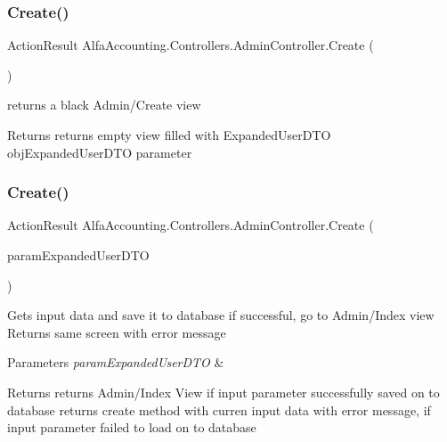 \subsubsection{\texorpdfstring{Create()}{Create()}\hspace{0.1cm}{\footnotesize\ttfamily [1/2]}}
{\footnotesize\ttfamily Action\+Result Alfa\+Accounting.\+Controllers.\+Admin\+Controller.\+Create (\begin{DoxyParamCaption}{ }\end{DoxyParamCaption})}



returns a black Admin/\+Create view 

\begin{DoxyReturn}{Returns}
returns empty view filled with Expanded\+User\+D\+TO obj\+Expanded\+User\+D\+TO parameter
\end{DoxyReturn}
\mbox{\label{class_alfa_accounting_1_1_controllers_1_1_admin_controller_a9b10157b4c6ffb1a37d8871e5c3d5df1}} 
\subsubsection{\texorpdfstring{Create()}{Create()}\hspace{0.1cm}{\footnotesize\ttfamily [2/2]}}
{\footnotesize\ttfamily Action\+Result Alfa\+Accounting.\+Controllers.\+Admin\+Controller.\+Create (\begin{DoxyParamCaption}\item[{Expanded\+User\+D\+TO}]{param\+Expanded\+User\+D\+TO }\end{DoxyParamCaption})}



Gets input data and save it to database if successful, go to Admin/\+Index view Returns same screen with error message 


\begin{DoxyParams}{Parameters}
{\em param\+Expanded\+User\+D\+TO} & \\
\hline
\end{DoxyParams}
\begin{DoxyReturn}{Returns}
returns Admin/\+Index View if input parameter successfully saved on to database returns create method with curren input data with error message, if input parameter failed to load on to database 
\end{DoxyReturn}
\mbox{\label{class_alfa_accounting_1_1_controllers_1_1_admin_controller_aea25bbf8560b6a0906c84e09b0845508}} 
